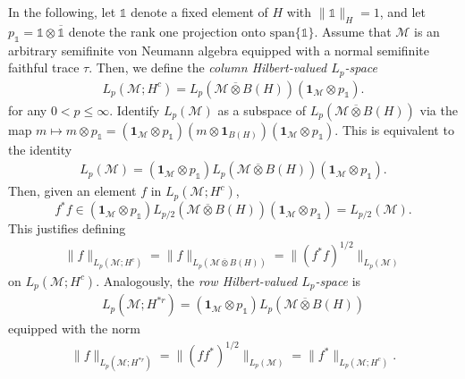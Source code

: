 \documentclass[psamsfonts]{amsart}
\newcommand{\Lp}{L_p}
\newcommand{\Lphalf}{L_{p/2}}
\newcommand{\Hc}{H^c}
\begin{document}
    In the following, let $\mathds{1}$ denote a fixed element of $H$ with $\|\mathds{1}\|_H = 1$, and let $p_{\mathds{1}} = \mathds{1} \otimes \overline{\mathds{1}}$ denote the rank one projection onto $\mathrm{span}\{\mathds{1}\}$. Assume that $\mathcal{M}$ is an arbitrary semifinite von Neumann algebra equipped with a normal semifinite faithful trace $\tau$. Then, we define the \emph{column Hilbert-valued $\Lp$-space}
    \begin{align*}
        \Lp(\mathcal{M};\Hc) = \Lp(\mathcal{M}\overline{\otimes} B(H))(\mathbf{1}_{\mathcal{M}}\otimes p_{\mathds{1}}).
    \end{align*}
    for any $0 < p \leq \infty$. Identify $\Lp(\mathcal{M})$ as a subspace of $\Lp(\mathcal{M} \overline{\otimes} B(H))$ via the map  $m \mapsto m \otimes p_{\mathds{1}} = ( \mathbf{1}_\mathcal{M} \otimes p_{\mathds{1}}) (m \otimes \mathbf{1}_{B(H)}) ( \mathbf{1}_\mathcal{M} \otimes p_{\mathds{1}})$. This is equivalent to the identity
    \begin{align*}
        \Lp(\mathcal{M}) = (\mathbf{1}_{\mathcal{M}} \otimes p_{\mathds{1}}) \Lp(\mathcal{M} \overline{\otimes} B(H)) (\mathbf{1}_{\mathcal{M}} \otimes p_{\mathds{1}}).
    \end{align*}
    Then, given an element $f$ in $\Lp(\mathcal{M};\Hc)$,
    $$
    f^*f \in (\mathbf{1}_{\mathcal{M}} \otimes p_{\mathds{1}}) \Lphalf(\mathcal{M} \overline{\otimes} B(H)) (\mathbf{1}_{\mathcal{M}} \otimes p_{\mathds{1}}) = \Lphalf(\mathcal{M}).$$
    This justifies defining
    \begin{align*}
        \|f\|_{\Lp(\mathcal{M};\Hc)} = \|f\|_{\Lp(\mathcal{M}\overline{\otimes} B(H))}=\|(f^*f)^{1/2}\|_{\Lp(\mathcal{M})}
    \end{align*}
    on $\Lp(\mathcal{M};\Hc)$. Analogously, the \emph{row Hilbert-valued $\Lp$-space} is
    \begin{align*}
        \Lp(\mathcal{M};H^{*r}) = (\mathbf{1}_{\mathcal{M}} \otimes p_{\mathds{1}}) \Lp(\mathcal{M} \overline{\otimes} B(H))
    \end{align*}
    equipped with the norm 
    \begin{align*}
        \|f\|_{\Lp(\mathcal{M};H^{*r})} = \|(f f^*)^{1/2}\|_{\Lp(\mathcal{M})}=\|f^*\|_{\Lp(\mathcal{M};\Hc)}.
    \end{align*}
       
\end{document}
